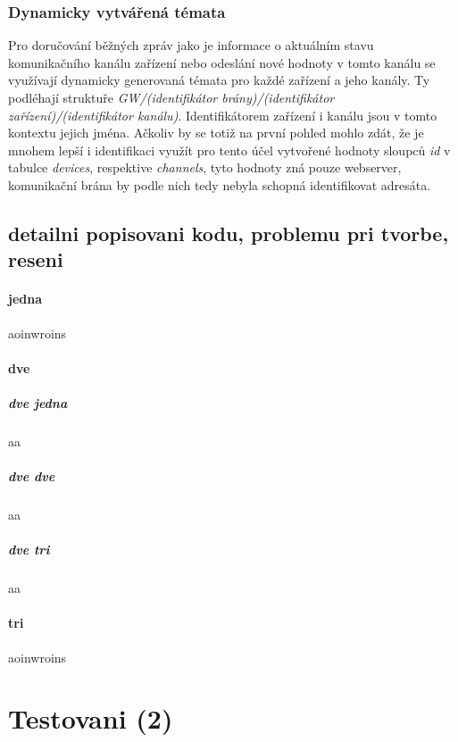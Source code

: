 \subsection{Dynamicky vytvářená témata}

Pro doručování běžných zpráv jako je informace o aktuálním stavu komunikačního kanálu zařízení nebo odeslání nové hodnoty v tomto kanálu se využívají dynamicky generovaná témata pro každé zařízení a jeho kanály. Ty podléhají struktuře \emph{GW/(identifikátor brány)/(identifikátor zařízení)/(identifikátor kanálu)}. Identifikátorem zařízení i kanálu jsou v tomto kontextu jejich jména. Ačkoliv by se totiž na první pohled mohlo zdát, že je mnohem lepší i identifikaci využít pro tento účel vytvořené hodnoty sloupců \emph{id} v tabulce \emph{devices}, respektive \emph{channels}, tyto hodnoty zná pouze webserver, komunikační brána by podle nich tedy nebyla schopná identifikovat adresáta.
\section{detailni popisovani kodu, problemu pri tvorbe, reseni}


\subsubsection{jedna}
    aoinwroins
\subsubsection{dve}
    \paragraph{dve jedna}
    aa
    \paragraph{dve dve}
    aa
    \paragraph{dve tri}
    aa
\subsubsection{tri}
    aoinwroins


\chapter{Testovani (2)}

